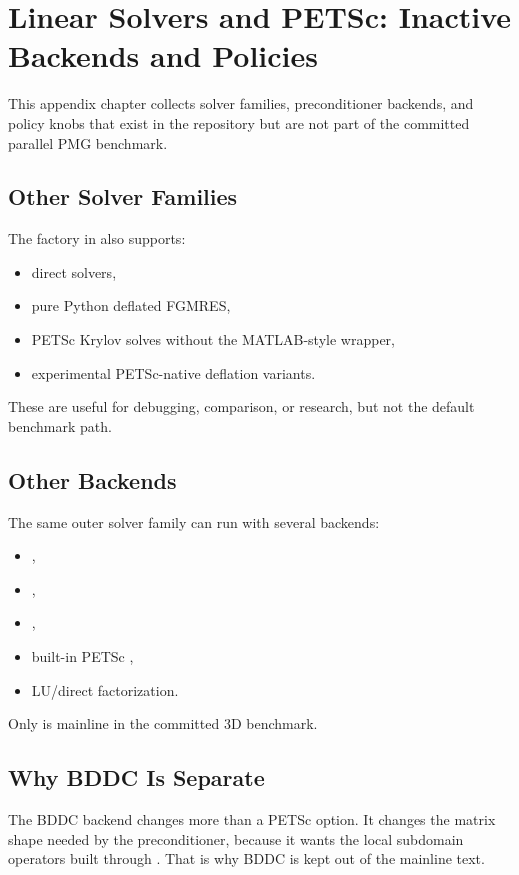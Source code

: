 \chapter{Linear Solvers and PETSc: Inactive Backends and Policies}
\label{app:linear}

This appendix chapter collects solver families, preconditioner backends, and
policy knobs that exist in the repository but are not part of the committed
parallel PMG benchmark.

\section{Other Solver Families}

The factory in  also supports:
\begin{itemize}
\item direct solvers,
\item pure Python deflated FGMRES,
\item PETSc Krylov solves without the MATLAB-style wrapper,
\item experimental PETSc-native deflation variants.
\end{itemize}

These are useful for debugging, comparison, or research, but not the default
benchmark path.

\section{Other Backends}

The same outer solver family can run with several backends:
\begin{itemize}
\item {},
\item {},
\item {},
\item built-in PETSc ,
\item LU/direct factorization.
\end{itemize}

Only  is mainline in the committed 3D benchmark.

\section{Why BDDC Is Separate}

The BDDC backend changes more than a PETSc option. It changes the matrix shape
needed by the preconditioner, because it wants the local subdomain operators
built through . That is why BDDC is kept out of the
mainline text.

